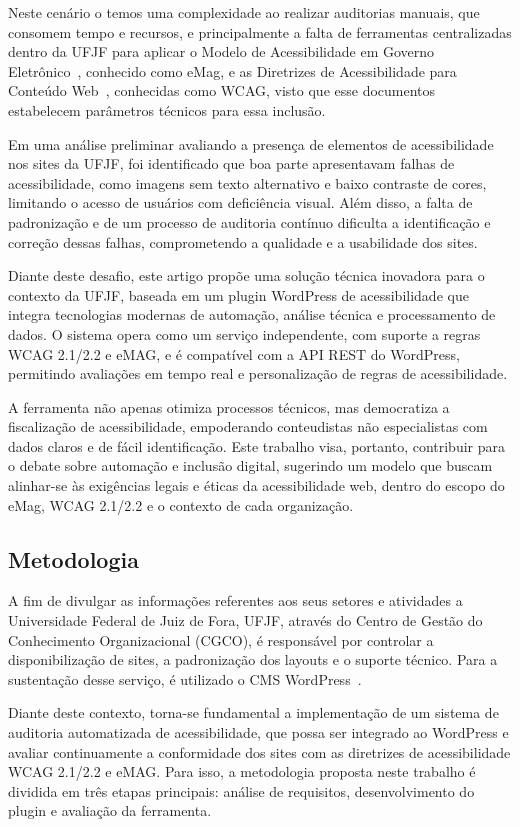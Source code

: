 \documentclass[12pt]{article}
\begin{document}
Neste cenário o temos uma complexidade ao realizar auditorias manuais, que 
consomem tempo e recursos, e principalmente a falta de ferramentas 
centralizadas dentro da UFJF para aplicar o Modelo de Acessibilidade em 
Governo Eletrônico~\cite{emag}, conhecido como eMag, e as Diretrizes 
de Acessibilidade para Conteúdo Web~\cite{wcag22}, conhecidas como 
WCAG, visto que esse documentos estabelecem parâmetros técnicos para essa inclusão.

Em uma análise preliminar avaliando a presença de elementos de acessibilidade nos
sites da UFJF, foi identificado que boa parte apresentavam falhas de acessibilidade, como imagens sem texto
alternativo e baixo contraste de cores, limitando o acesso de usuários com deficiência
visual. Além disso, a falta de padronização e de um processo de auditoria contínuo
dificulta a identificação e correção dessas falhas, comprometendo a qualidade e a
usabilidade dos sites.

Diante deste desafio, este artigo propõe uma solução técnica inovadora para o contexto
da UFJF, baseada em um plugin WordPress de acessibilidade que integra tecnologias
modernas de automação, análise técnica e processamento de dados. O sistema opera
como um serviço independente, com suporte a regras WCAG 2.1/2.2 e eMAG, e é
compatível com a API REST do WordPress, permitindo avaliações em tempo real e
personalização de regras de acessibilidade.

A ferramenta não apenas otimiza processos técnicos, mas democratiza 
a fiscalização de acessibilidade, empoderando conteudistas não especialistas 
com dados claros e de fácil identificação. Este trabalho visa, portanto, contribuir
para o debate sobre automação e inclusão digital, sugerindo um modelo que buscam alinhar-se às exigências legais e éticas da
acessibilidade web, dentro do escopo do eMag, WCAG 2.1/2.2 e o contexto de cada
organização.

\subsection{Metodologia}\label{subsec:metodologia}
A fim de divulgar as informações referentes aos seus setores e atividades a 
Universidade Federal de Juiz de Fora, UFJF, através do Centro de Gestão 
do Conhecimento Organizacional (CGCO), é responsável por controlar a 
disponibilização de sites, a padronização dos layouts e o suporte técnico. Para
a sustentação desse serviço, é utilizado o CMS WordPress~.

Diante deste contexto, torna-se fundamental a implementação de um sistema de
auditoria automatizada de acessibilidade, que possa ser integrado ao WordPress e
avaliar continuamente a conformidade dos sites com as diretrizes de acessibilidade
WCAG 2.1/2.2 e eMAG\@. Para isso, a metodologia proposta neste trabalho é dividida
em três etapas principais: análise de requisitos, desenvolvimento do plugin e
avaliação da ferramenta.
\end{document}
